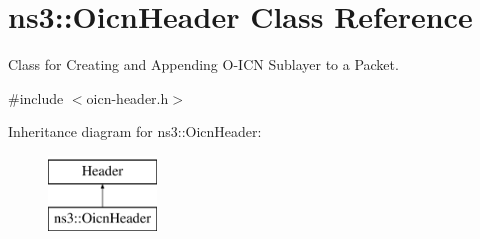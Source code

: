 \hypertarget{classns3_1_1OicnHeader}{\section{ns3\-:\-:Oicn\-Header Class Reference}
\label{classns3_1_1OicnHeader}
}


Class for Creating and Appending O-\/\-I\-C\-N Sublayer to a Packet.  




{\ttfamily \#include $<$oicn-\/header.\-h$>$}

Inheritance diagram for ns3\-:\-:Oicn\-Header\-:\begin{figure}[H]
\begin{center}
\leavevmode
\includegraphics[height=2.000000cm]{classns3_1_1OicnHeader}
\end{center}
\end{figure}
